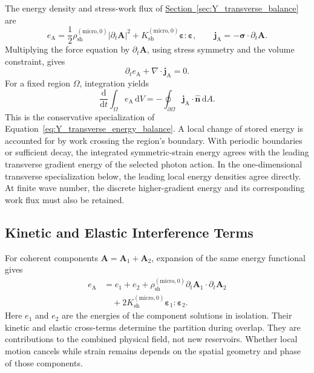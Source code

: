 The energy density and stress-work flux of \hyperref[sec:Y_transverse_balance]{Section~\ref*{sec:Y_transverse_balance}} are
\begin{equation}
    e_{\mathrm A}
    =\frac12\rho_{\mathrm{sh}}^{(\mathrm{micro},0)}
    |\partial_t\mathbf A|^2
    +K_{\mathrm{sh}}^{(\mathrm{micro},0)}
    \boldsymbol\varepsilon:\boldsymbol\varepsilon,
    \qquad
    \mathbf j_{\mathrm A}=-\boldsymbol\sigma\cdot\partial_t\mathbf A.
\end{equation}
Multiplying the force equation by $\partial_t\mathbf A$, using stress symmetry and the volume constraint, gives
\begin{equation}
    \boxed{\partial_te_{\mathrm A}+\nabla\cdot\mathbf j_{\mathrm A}=0}.
\end{equation}
For a fixed region $\Omega$, integration yields
\begin{equation}
    \boxed{
    \frac{\mathrm d}{\mathrm dt}\int_\Omega e_{\mathrm A}\,\mathrm dV
    =-\oint_{\partial\Omega}
    \mathbf j_{\mathrm A}\cdot\widehat{\mathbf n}\,\mathrm dA
    }.
\end{equation}
This is the conservative specialization of Equation~\eqref{eq:Y_transverse_energy_balance}. A local change of stored energy is accounted for by work crossing the region's boundary. With periodic boundaries or sufficient decay, the integrated symmetric-strain energy agrees with the leading transverse gradient energy of the selected photon action. In the one-dimensional transverse specialization below, the leading local energy densities agree directly. At finite wave number, the discrete higher-gradient energy and its corresponding work flux must also be retained.

\subsection{Kinetic and Elastic Interference Terms}

For coherent components $\mathbf A=\mathbf A_1+\mathbf A_2$, expansion of the same energy functional gives
\begin{align}
    e_{\mathrm A}
    &=e_1+e_2
    +\rho_{\mathrm{sh}}^{(\mathrm{micro},0)}
      \partial_t\mathbf A_1\cdot\partial_t\mathbf A_2
    \nonumber\\
    &\quad
    +2K_{\mathrm{sh}}^{(\mathrm{micro},0)}
      \boldsymbol\varepsilon_1:\boldsymbol\varepsilon_2.
\end{align}
Here $e_1$ and $e_2$ are the energies of the component solutions in isolation. Their kinetic and elastic cross-terms determine the partition during overlap. They are contributions to the combined physical field, not new reservoirs. Whether local motion cancels while strain remains depends on the spatial geometry and phase of those components.


